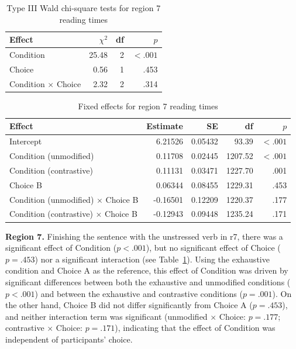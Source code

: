 \documentclass[ruler]{CUP-JNL-LIN}%
\begin{document}


\begin{table}[htbp]
\centering
\caption{Type III Wald chi-square tests for region 7 reading times}
\label{tab:r7}
\begin{tabularx}{\textwidth}{@{}Xrrr@{}}
\toprule
Effect & $\chi^2$ & df & $p$ \\
\midrule
Condition & 25.48 & 2 & $< .001$ \\
Choice & 0.56 & 1 & .453 \\
Condition $\times$ Choice & 2.32 & 2 & .314 \\
\bottomrule
\end{tabularx}
\end{table}

\begin{table}[htbp]
\centering
\caption{Fixed effects for region 7 reading times}
\label{tab:r7-fixed}
\begin{tabularx}{\textwidth}{@{}Xrrrr@{}}
\toprule
Effect & Estimate & SE & df & $p$ \\
\midrule
Intercept & 6.21526 & 0.05432 & 93.39 & $< .001$ \\
Condition (unmodified) & 0.11708 & 0.02445 & 1207.52 & $< .001$ \\
Condition (contrastive) & 0.11131 & 0.03471 & 1227.70 & .001 \\
Choice B & 0.06344 & 0.08455 & 1229.31 & .453 \\
Condition (unmodified) $\times$ Choice B & -0.16501 & 0.12209 & 1220.37 & .177 \\
Condition (contrastive) $\times$ Choice B & -0.12943 & 0.09448 & 1235.24 & .171 \\
\bottomrule
\end{tabularx}
\end{table}


\noindent \textbf{Region 7.} Finishing the sentence with the unstressed verb in r7, there was a significant effect of Condition ($p<.001$), but no significant effect of Choice ($p=.453$) nor a significant interaction (see Table~\ref{tab:r7}). Using the exhaustive condition and Choice A as the reference, this effect of Condition was driven by significant differences between both the exhaustive and unmodified conditions ($p<.001$) and between the exhaustive and contrastive conditions ($p=.001$). On the other hand, Choice B did not differ significantly from Choice A ($p=.453$), and neither interaction term was significant (unmodified $\times$ Choice: $p=.177$; contrastive $\times$ Choice: $p=.171$), indicating that the effect of Condition was independent of participants' choice.
\end{document}
